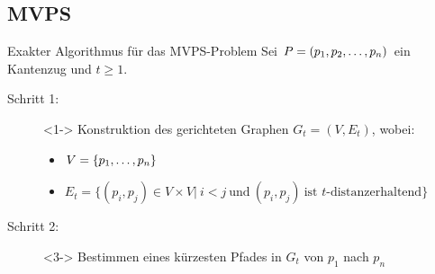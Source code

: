 \documentclass{beamer}
\begin{document}
	\subsection{MVPS}
	\begin{frame}{Exakter Algorithmus für das MVPS-Problem}
		Sei $P = (p_1, p_2, \mathellipsis, p_n)$ ein Kantenzug und $t \geq 1$.
		\begin{description}
			\item[Schritt 1:]<1-> Konstruktion des gerichteten Graphen $G_t = (V, E_t)$, wobei:
			\begin{itemize}
				\setlength{\itemindent}{-1.3cm}
				\item $V = \{p_1, \mathellipsis, p_n\}$
				\item $E_t = \{(p_i, p_j) \in V\times V|\ i < j\ \text{und}\ (p_i,p_j)\ \text{ist $t$-distanzerhaltend}\}$
			\end{itemize}
			\item[Schritt 2:]<3-> Bestimmen eines kürzesten Pfades in $G_t$ von $p_1$ nach $p_n$
		\end{description}
	\end{frame}
	
\end{document}
